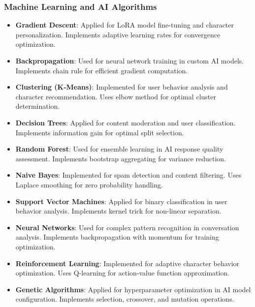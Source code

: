 \documentclass[conference]{IEEEtran}
\begin{document}
\subsubsection{Machine Learning and AI Algorithms}
\begin{itemize}
\item \textbf{Gradient Descent}: Applied for LoRA model fine-tuning and character personalization. Implements adaptive learning rates for convergence optimization.
\item \textbf{Backpropagation}: Used for neural network training in custom AI models. Implements chain rule for efficient gradient computation.
\item \textbf{Clustering (K-Means)}: Implemented for user behavior analysis and character recommendation. Uses elbow method for optimal cluster determination.
\item \textbf{Decision Trees}: Applied for content moderation and user classification. Implements information gain for optimal split selection.
\item \textbf{Random Forest}: Used for ensemble learning in AI response quality assessment. Implements bootstrap aggregating for variance reduction.
\item \textbf{Naive Bayes}: Implemented for spam detection and content filtering. Uses Laplace smoothing for zero probability handling.
\item \textbf{Support Vector Machines}: Applied for binary classification in user behavior analysis. Implements kernel trick for non-linear separation.
\item \textbf{Neural Networks}: Used for complex pattern recognition in conversation analysis. Implements backpropagation with momentum for training optimization.
\item \textbf{Reinforcement Learning}: Implemented for adaptive character behavior optimization. Uses Q-learning for action-value function approximation.
\item \textbf{Genetic Algorithms}: Applied for hyperparameter optimization in AI model configuration. Implements selection, crossover, and mutation operations.
\end{itemize}
\end{document}
